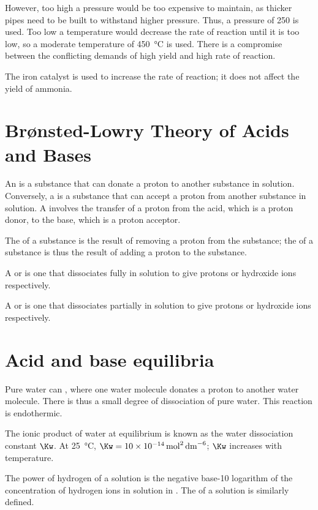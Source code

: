 \documentclass[Chemistry.tex]{subfiles}
\begin{document}
However, too high a pressure would be too expensive to maintain, as thicker pipes need to be built to withstand higher pressure. Thus, a pressure of \SI{250}{\atmosphere} is used. Too low a temperature would decrease the rate of reaction until it is too low, so a moderate temperature of \SI{450}{\celsius} is used. There is a compromise between the conflicting demands of high yield and high rate of reaction.

The iron catalyst is used to increase the rate of reaction; it does not affect the yield of ammonia.
\section{Br\o{}nsted-Lowry Theory of Acids and Bases}
An  is a substance that can donate a proton to another substance in solution. Conversely, a  is a substance that can accept a proton from another substance in solution. A  involves the transfer of a proton from the acid, which is a proton donor, to the base, which is a proton acceptor.

The  of a substance is the result of removing a proton from the substance; the  of a substance is thus the result of adding a proton to the substance.

A  or  is one that dissociates fully in solution to give protons or hydroxide ions respectively.

A  or  is one that dissociates partially in solution to give protons or hydroxide ions respectively.
\section{Acid and base equilibria}
Pure water can , where one water molecule donates a proton to another water molecule. There is thus a small degree of dissociation of pure water. This reaction is endothermic.

The ionic product of water at equilibrium is known as the water dissociation constant \(\Kw\). At \SI{25}{\celsius}, \(\Kw = \SI{10e-14}{\mol\squared\per\deci\metre\tothe{6}}\); \(\Kw\) increases with temperature.

The power of hydrogen \pH{} of a solution is the negative base-10 logarithm of the concentration of hydrogen ions in solution in \si{\molar}. The \pOH{} of a solution is similarly defined.
\end{document}
